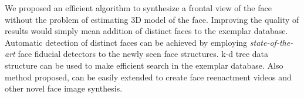 % 
% 
% 

We proposed an efficient algorithm to synthesize a frontal view of the face without the 
problem of estimating 3D model of the face. Improving the quality of results would simply
mean addition of distinct faces to the exemplar database. Automatic detection of distinct
faces can be achieved by employing \textit{state-of-the-art} face fiducial detectors to 
the newly seen face structures. k-d tree data structure can be used to make efficient search 
in the exemplar database. Also method proposed, can be easily extended to create face 
reenactment videos and other novel face image synthesis.
